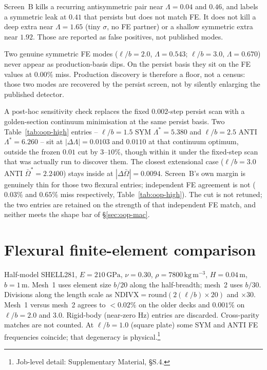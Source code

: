 \documentclass[11pt]{article}
\begin{document}
Screen~B kills a recurring antisymmetric pair near $\Lambda=0.04$ and
$0.46$, and labels a symmetric leak at $0.41$ that persists but does not
match FE. It does not kill a deep extra near $\Lambda=1.65$ (tiny
$\sigma$, no FE partner) or a shallow symmetric extra near $1.92$. Those
are reported as false positives, not published modes.

Two genuine symmetric FE modes ($\ell/b=2.0$, $\Lambda=0.543$;
$\ell/b=3.0$, $\Lambda=0.670$) never appear as production-basis dips. On
the persist basis they sit on the FE values at $0.00\%$ miss. Production
discovery is therefore a floor, not a census: those two modes are
recovered by the persist screen, not by silently enlarging the published
detector.

A post-hoc sensitivity check replaces the fixed $0.002$-step persist
scan with a golden-section continuum minimisation at the same persist
basis. Two Table~\ref{tab:oop-high} entries -- $\ell/b=1.5$ SYM
$\Lambda^{*}=5.380$ and $\ell/b=2.5$ ANTI $\Lambda^{*}=6.260$ -- sit at
$|\Delta\Lambda|=0.0103$ and $0.0110$ at that continuum optimum, outside
the frozen $0.01$ cut by $3$--$10\%$, though within it under the
fixed-step scan that was actually run to discover them. The closest
extensional case ($\ell/b=3.0$ ANTI $\bar\Omega^{*}=2.2400$) stays inside
at $|\Delta\bar\Omega|=0.0094$. Screen~B's own margin is genuinely thin
for those two flexural entries; independent FE agreement is not
($0.03\%$ and $0.65\%$ miss respectively, Table~\ref{tab:oop-high}). The
cut is not retuned; the two entries are retained on the strength of that
independent FE match, and neither meets the shape bar of
\S\ref{sec:oop-mac}.

\section{Flexural finite-element comparison}\label{sec:oopfe}
Half-model SHELL281, $E=210\,\mathrm{GPa}$, $\nu=0.30$,
$\rho=7800\,\mathrm{kg\,m^{-3}}$, $H=0.04\,\mathrm{m}$, $b=1\,\mathrm{m}$.
Mesh~1 uses element size $b/20$ along the half-breadth; mesh~2 uses
$b/30$. Divisions along the length scale as
$\mathrm{NDIVX}=\mathrm{round}(2(\ell/b)\times 20)$ and $\times 30$.
Mesh~1 versus mesh~2 agrees to $<0.02\%$ on the older decks and
$0.001\%$ on $\ell/b=2.0$ and $3.0$. Rigid-body (near-zero Hz) entries
are discarded. Cross-parity matches are not counted. At $\ell/b=1.0$
(square plate) some SYM and ANTI FE frequencies coincide; that
degeneracy is physical.\footnote{Job-level detail: Supplementary
Material, \S{}S.4.}
\end{document}
